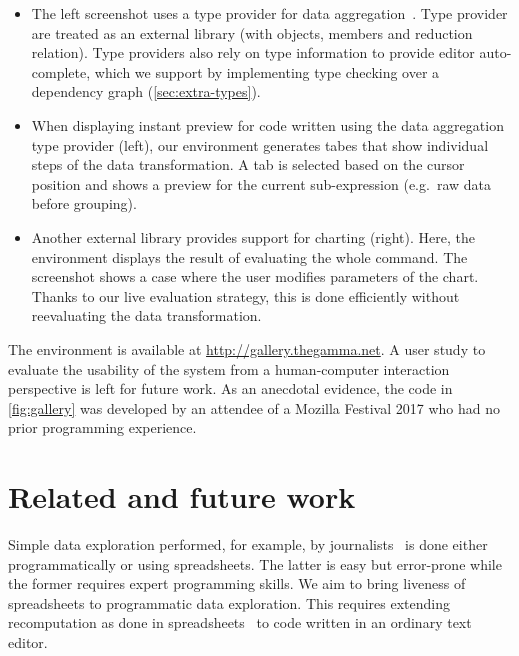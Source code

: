 \documentclass[english,crc,references=cleveref]{programming}
\theoremstyle{plain}
\theoremstyle{definition}
\begin{document}
\begin{itemize}
\item The left screenshot uses a type provider for data aggregation~\cite{gamma}.
  Type provider are treated as an external library
  (with objects, members and reduction relation). Type providers also rely on type information to
  provide editor auto-complete, which we support by implementing type checking over a
  dependency graph (\cref{sec:extra-types}).

\item When displaying instant preview for code written using the data aggregation type provider (left),
  our environment generates tabes that show individual steps of the data transformation.
  A tab is selected based on the cursor position and shows a preview for the current sub-expression
  (e.\hairspace g.~raw data before grouping).

\item Another external library provides support for charting (right). Here, the environment
  displays the result of evaluating the whole command. The screenshot shows a case where the user
  modifies parameters of the chart. Thanks to our live evaluation
  strategy, this is done efficiently without reevaluating the data transformation.
\end{itemize}
%
%
The environment is available at \url{http://gallery.thegamma.net}.
A user study to evaluate the usability of the system from a human-computer interaction perspective
is left for future work. As an anecdotal evidence, the code in
\cref{fig:gallery} was developed by an attendee of a Mozilla Festival 2017
who had no prior programming experience.



\section{Related and future work}
\label{sec:future}

Simple data exploration performed, for example, by journalists~\cite{ddj} is done either
programmatically or using spreadsheets. The latter is easy but error-prone while the former
requires expert programming skills. We aim to bring liveness of spreadsheets to programmatic
data exploration. This requires extending recomputation as done in spreadsheets~\cite{spreadsheet}
to code written in an ordinary text editor.
\end{document}
